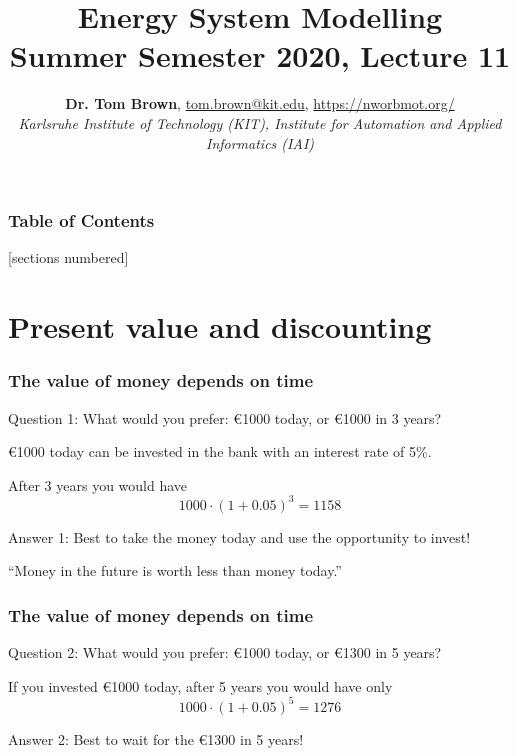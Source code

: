 \documentclass[10pt,aspectratio=169,dvipsnames]{beamer}
\title{Energy System Modelling\\ Summer Semester 2020, Lecture 11}
\author{
  {\bf Dr. Tom Brown}, \href{mailto:tom.brown@kit.edu}{tom.brown@kit.edu}, \url{https://nworbmot.org/}\\
  \emph{Karlsruhe Institute of Technology (KIT), Institute for Automation and Applied Informatics (IAI)}
}
\date{}
\begin{document}
\maketitle


\begin{frame}

  \frametitle{Table of Contents}
  [sections numbered]
  \tableofcontents[hideallsubsections]
\end{frame}


\section{Present value and discounting}


\begin{frame}
  \frametitle{The value of money depends on time}


  \alert{Question 1:} What would you prefer: \euro 1000 today, or \euro 1000 in 3 years?

  \pause

  \euro 1000 today can be invested in the bank with an interest rate of 5\%.

  After 3 years you would have
  \begin{equation*}
     1000 \cdot (1 + 0.05)^3 = 1158
  \end{equation*}

  \alert{Answer 1:} Best to take the money today and use the opportunity to invest!

  \vspace{.5cm}

 ``Money in the future is worth less than money today.''

\end{frame}


\begin{frame}
  \frametitle{The value of money depends on time}


  \alert{Question 2:} What would you prefer: \euro 1000 today, or \euro 1300 in 5  years?

  \pause

  If you invested \euro 1000 today, after 5 years you would have only
  \begin{equation*}
     1000 \cdot (1 + 0.05)^5 = 1276
  \end{equation*}

  \alert{Answer 2:} Best to wait for the \euro 1300 in 5 years!


\end{frame}
\end{document}
